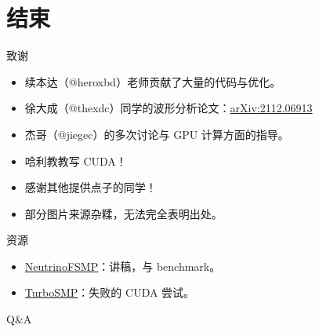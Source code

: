 \documentclass[aspectratio=169]{beamer}
\begin{document}
\section{结束}
\begin{frame}

    \begin{block}{致谢}
        \begin{itemize}
            \item 续本达（@heroxbd）老师贡献了大量的代码与优化。
            \item 徐大成（@thexdc）同学的波形分析论文：\href{https://arxiv.org/abs/2112.06913}{arXiv:2112.06913}
            \item 杰哥（@jiegec）的多次讨论与 GPU 计算方面的指导。
            \item 哈利教教写 CUDA！
            \item 感谢其他提供点子的同学！
            \item 部分图片来源杂糅，无法完全表明出处。
        \end{itemize}
    \end{block}

    \begin{block}{资源}
        \begin{itemize}
            \item \href{https://github.com/Berrysoft/NeutrinoFSMP}{NeutrinoFSMP}：讲稿，与 benchmark。
            \item \href{https://github.com/Berrysoft/TurboSMP}{TurboSMP}：失败的 CUDA 尝试。
        \end{itemize}
    \end{block}

\end{frame}

\begin{frame}[noframenumbering]

    \begin{minipage}{1\textwidth}
        \centering Q\&A
    \end{minipage}

\end{frame}
\end{document}
